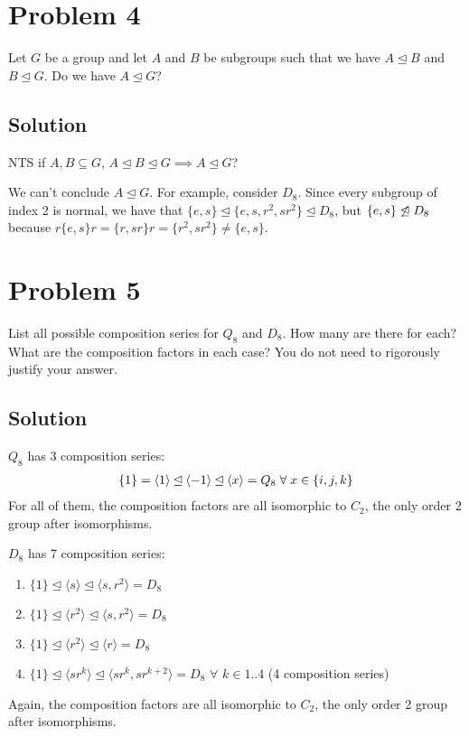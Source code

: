 \documentclass[fleqn]{article}
\begin{document}
    \section{Problem 4}
    Let $G$ be a group and let $A$ and $B$ be subgroups such that we have $A \unlhd B$ and $B \unlhd G$.  Do we have $A \unlhd G$?
        
        \subsection{Solution}
        NTS if $A, B \subseteq G$, $A \unlhd B \unlhd G \implies A \unlhd G$?
        
        We can't conclude $A \unlhd G$.  For example, consider $D_8$.  Since every subgroup of index 2 is normal, we have that $\{e, s\} \unlhd \{e, s, r^2, sr^2\} \unlhd D_8$, but $\{e, s\} \centernot{\unlhd} D_8$ because $r\{e, s\}r = \{r, sr\}r = \{r^2, sr^2\} \neq \{e, s\}$.
    
    \section{Problem 5}
    List all possible composition series for $Q_8$ and $D_8$.  How many are there for each?  What are the composition factors in each case?  You do not need to rigorously justify your answer.
        
        \subsection{Solution}
        $Q_8$ has 3 composition series: 
        \begin{align}
            \{1\} = \langle 1 \rangle \unlhd \langle -1 \rangle \unlhd \langle x \rangle= Q_8 \thickspace \forall \thickspace x \in \{i, j, k\}
        \end{align}
        For all of them, the composition factors are all isomorphic to $C_2$, the only order 2 group after isomorphisms.
        
        $D_8$ has 7 composition series:
        \begin{enumerate}
            \item $\{1\} \unlhd \langle s \rangle \unlhd \langle s, r^2 \rangle= D_8$
            \item $\{1\} \unlhd \langle r^2 \rangle \unlhd \langle s, r^2 \rangle= D_8$
            \item $\{1\} \unlhd \langle r^2 \rangle \unlhd \langle r \rangle= D_8$
            \item $\{1\} \unlhd \langle sr^k \rangle \unlhd \langle sr^k ,sr^{k + 2} \rangle= D_8$ $\forall$ $k \in 1..4$ (4 composition series)
        \end{enumerate}
        Again, the composition factors are all isomorphic to $C_2$, the only order 2 group after isomorphisms.
    
\end{document}
